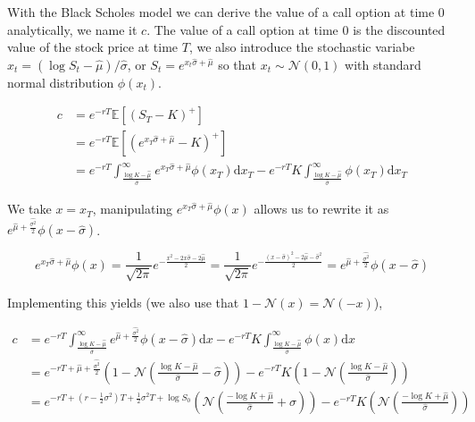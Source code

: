 \documentclass[11pt,a4paper]{article}
\begin{document}
With the Black Scholes model we can derive the value of a call option at time 0 analytically, we name it $c$. The value of a call option at time 0 is the discounted value of the stock price at time $T$, we also introduce the stochastic variabe $x_t=(\log S_t-\hat{\mu})/\hat{\sigma}$, or $S_t=e^{x_t\hat{\sigma}+\hat{\mu}}$ so that $x_t \sim \mathcal{N}(0,1)$ with standard normal distribution $\phi(x_t)$.

\begin{align}
c&=e^{-rT}\mathbb{E}\left[(S_T-K)^+\right]\nonumber \\
&=e^{-rT}\mathbb{E}\left[\left(e^{x_T\hat{\sigma}+\hat{\mu}}-K\right)^+\right]\nonumber \\
&=e^{-rT}\int_{\frac{\log K -\hat{\mu}}{\hat{\sigma}}}^{\infty}{e^{x_T\hat{\sigma}+\hat{\mu}}\phi(x_T)}\mathrm{d}x_T-e^{-rT}K\int_{\frac{\log K -\hat{\mu}}{\hat{\sigma}}}^{\infty}{\phi(x_T)}\mathrm{d}x_T
\end{align}

We take $x=x_T$, manipulating $e^{x_T\hat{\sigma}+\hat{\mu}}\phi(x)$ allows us to rewrite it as $e^{\hat{\mu}+\frac{\hat{\sigma^2}}{2}}\phi(x-\hat{\sigma})$.

\begin{equation}
e^{x_T\hat{\sigma}+\hat{\mu}}\phi(x)=\frac{1}{\sqrt{2\pi}}e^{-\frac{x^2-2x\hat{\sigma}-2\hat{\mu}}{2}}=\frac{1}{\sqrt{2\pi}}e^{-\frac{(x-\hat{\sigma})^2-2\hat{\mu}-\hat{\sigma}^2}{2}}=e^{\hat{\mu}+\frac{\hat{\sigma^2}}{2}}\phi(x-\hat{\sigma})
\end{equation}

Implementing this yields (we also use that $1-\mathcal{N}(x)=\mathcal{N}(-x)$),

\begin{align}
c&=e^{-rT}\int_{\frac{\log K -\hat{\mu}}{\hat{\sigma}}}^{\infty}{e^{\hat{\mu}+\frac{\hat{\sigma^2}}{2}}\phi(x-\hat{\sigma})}\mathrm{d}x-e^{-rT}K\int_{\frac{\log K -\hat{\mu}}{\hat{\sigma}}}^{\infty}{\phi(x)}\mathrm{d}x \nonumber \\
&= e^{-rT+\hat{\mu}+\frac{\hat{\sigma^2}}{2}}\left(1-\mathcal{N}\left(\frac{\log K -\hat{\mu}}{\hat{\sigma}}-\hat{\sigma}\right)\right)-e^{-rT}K\left(1-\mathcal{N}\left(\frac{\log K -\hat{\mu}}{\hat{\sigma}}\right)\right)\nonumber \\
&= e^{-rT+\left(r-\frac{1}{2}\sigma^2\right)T+\frac{1}{2}\sigma^2T+\log S_0}\left(\mathcal{N}\left(\frac{-\log K +\hat{\mu}}{\hat{\sigma}}+\hat{\sigma}\right)\right)-e^{-rT}K\left(\mathcal{N}\left(\frac{-\log K +\hat{\mu}}{\hat{\sigma}}\right)\right)
\end{align}
\end{document}
